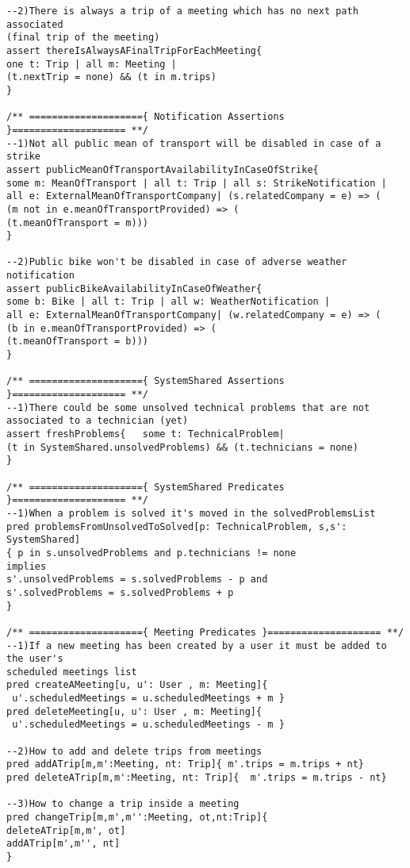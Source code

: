 \documentclass[a4paper,leqno]{book}
\begin{document}
\begin{lstlisting}
--2)There is always a trip of a meeting which has no next path associated
(final trip of the meeting)
assert thereIsAlwaysAFinalTripForEachMeeting{
one t: Trip | all m: Meeting |
(t.nextTrip = none) && (t in m.trips)
}

/** ===================={ Notification Assertions }==================== **/
--1)Not all public mean of transport will be disabled in case of a strike
assert publicMeanOfTransportAvailabilityInCaseOfStrike{
some m: MeanOfTransport | all t: Trip | all s: StrikeNotification | 
all e: ExternalMeanOfTransportCompany| (s.relatedCompany = e) => (
(m not in e.meanOfTransportProvided) => (
(t.meanOfTransport = m)))
}

--2)Public bike won't be disabled in case of adverse weather notification
assert publicBikeAvailabilityInCaseOfWeather{
some b: Bike | all t: Trip | all w: WeatherNotification | 
all e: ExternalMeanOfTransportCompany| (w.relatedCompany = e) => (
(b in e.meanOfTransportProvided) => (
(t.meanOfTransport = b)))
}

/** ===================={ SystemShared Assertions }==================== **/
--1)There could be some unsolved technical problems that are not
associated to a technician (yet)
assert freshProblems{	some t: TechnicalProblem|
(t in SystemShared.unsolvedProblems) && (t.technicians = none)
}

/** ===================={ SystemShared Predicates }==================== **/
--1)When a problem is solved it's moved in the solvedProblemsList
pred problemsFromUnsolvedToSolved[p: TechnicalProblem, s,s': SystemShared]
{ p in s.unsolvedProblems and p.technicians != none
implies
s'.unsolvedProblems = s.solvedProblems - p and 
s'.solvedProblems = s.solvedProblems + p
}

/** ===================={ Meeting Predicates }==================== **/
--1)If a new meeting has been created by a user it must be added to the user's
scheduled meetings list
pred createAMeeting[u, u': User , m: Meeting]{
 u'.scheduledMeetings = u.scheduledMeetings + m }
pred deleteMeeting[u, u': User , m: Meeting]{
 u'.scheduledMeetings = u.scheduledMeetings - m }

--2)How to add and delete trips from meetings
pred addATrip[m,m':Meeting, nt: Trip]{ m'.trips = m.trips + nt}
pred deleteATrip[m,m':Meeting, nt: Trip]{  m'.trips = m.trips - nt}

--3)How to change a trip inside a meeting
pred changeTrip[m,m',m'':Meeting, ot,nt:Trip]{
deleteATrip[m,m', ot]
addATrip[m',m'', nt]
}


\end{lstlisting}
\end{document}
